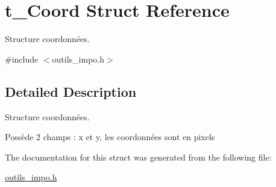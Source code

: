 \hypertarget{structt__Coord}{\section{t\-\_\-\-Coord Struct Reference}
\label{structt__Coord}
}


Structure coordonnées.  




{\ttfamily \#include $<$outils\-\_\-impo.\-h$>$}



\subsection{Detailed Description}
Structure coordonnées. 

Possède 2 champs \-: x et y, les coordonnées sont en pixels 

The documentation for this struct was generated from the following file\-:\begin{DoxyCompactItemize}
\item 
\hyperlink{outils__impo_8h}{outils\-\_\-impo.\-h}\end{DoxyCompactItemize}
